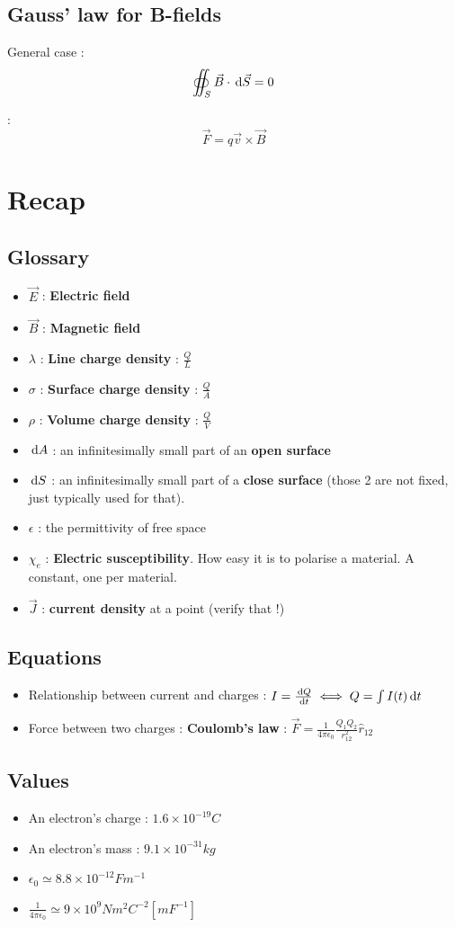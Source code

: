 \documentclass[12pt,a4paper]{article}
\begin{document}
\subsection*{Gauss' law for B-fields}
General case :
\begin{equation}
	\oiint_S \vec{B} \cdot \, \mathrm d \vec{S} = 0
\end{equation}




\begin{boite}
	 : 
	\[\vec{F} = q\vec{v}\times \vec{B}\]
\end{boite}



\section{Recap}
\subsection{Glossary}
\begin{itemize}
	\item $\vec{E}$ : \textbf{Electric field}
	\item $\vec{B}$ : \textbf{Magnetic field}
	\item $\lambda$ : \textbf{Line charge density} : $\frac{Q}{L}$
	\item $\sigma$ : \textbf{Surface charge density} : $\frac{Q}{A}$
	\item $\rho$ : \textbf{Volume charge density} : $\frac{Q}{V}$
	\item $\, \mathrm d A$ : an infinitesimally small part of an \textbf{open surface}
	\item $\, \mathrm d S$ : an infinitesimally small part of a \textbf{close surface} (those 2 are not fixed, just typically used for that).
	\item $\epsilon$ : the permittivity of free space
	\item $\chi_e$ : \textbf{Electric susceptibility}. How easy it is to polarise a material. A constant, one per material.	
	\item $\vec{J}$ : \textbf{current density} at a point (verify that !)
\end{itemize}

\subsection{Equations}
\begin{itemize}
	\item 	Relationship between current and charges : $I = \frac{\, \mathrm d Q}{\, \mathrm d t} \iff Q = \int I(t) \, \mathrm d t$
	\item 	Force between two charges : \textbf{Coulomb's law} : $\vec{F} = \frac{1}{4\pi\epsilon_0}\frac{Q_1Q_2}{r_{12}^2}\hat{r}_{12}$
\end{itemize}

\subsection{Values}
\begin{itemize}
	\item 	An electron's charge : $1.6\times 10^{-19} C$
	\item 	An electron's mass : $9.1 \times 10^{-31} kg$	
	\item 	$\epsilon_0 \simeq 8.8\times 10^{-12}Fm^{-1}$
	\item 	$\frac{1}{4\pi\epsilon_0} \simeq 9\times 10^9 Nm^2C^{-2}[mF^{-1}]$
\end{itemize}
\end{document}
